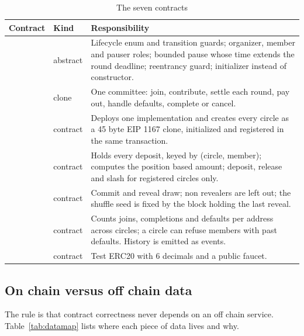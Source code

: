 \begin{table}[H]
\centering\small
\caption{The seven contracts}
\label{tab:contracts}
\begin{tabularx}{\textwidth}{@{}P{3.6cm}P{2cm}L@{}}
\toprule
Contract & Kind & Responsibility \\
\midrule
{} & abstract & Lifecycle enum and transition guards; organizer, member and pauser roles; bounded pause whose time extends the round deadline; reentrancy guard; initializer instead of constructor. \\
 & clone & One committee: join, contribute, settle each round, pay out, handle defaults, complete or cancel. \\
 & contract & Deploys one  implementation and creates every circle as a 45 byte EIP 1167 clone, initialized and registered in the same transaction. \\
 & contract & Holds every deposit, keyed by (circle, member); computes the position based amount; deposit, release and slash for registered circles only. \\
 & contract & Commit and reveal draw; non revealers are left out; the shuffle seed is fixed by the block holding the last reveal. \\
 & contract & Counts joins, completions and defaults per address across circles; a circle can refuse members with past defaults. History is emitted as events. \\
 & contract & Test ERC20 with 6 decimals and a public faucet. \\
\bottomrule
\end{tabularx}
\end{table}

\subsection{On chain versus off chain data}
\label{sec:datamap}
The rule is that contract correctness never depends on an off chain service. Table~\ref{tab:datamap}
lists where each piece of data lives and why.

